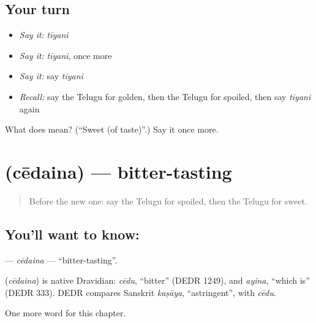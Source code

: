 \subsection*{Your turn}
\begin{itemize}
\raggedright
  \item \emph{Say it:} \emph{tīyani}
  \item \emph{Say it:} \emph{tīyani}, once more
  \item \emph{Say it:} say \emph{tīyani}
  \item \emph{Recall:} say the Telugu for golden, then the Telugu for spoiled, then say \emph{tīyani} again
\end{itemize}

\begin{tcolorbox}[breakable,colback=teal!4,colframe=teal!35!black,title={Before you move on}]
What does  mean? (\textquotedblleft{}Sweet (of taste)\textquotedblright{}.) Say it once more.
\end{tcolorbox}
\section[\texorpdfstring{\te{చేదైన} (cēdaina)}{చేదైన (cēdaina)}]{ (cēdaina) — bitter-tasting}

\label{lesson:TE-C141-cedaina}



\begin{quote}
Before the new one: say the Telugu for spoiled, then the Telugu for sweet.
\end{quote}

\subsection*{You'll want to know: }
\textbf{} — \emph{cēdaina} — \textquotedblleft{}bitter-tasting\textquotedblright{}.

\begin{cousinweb}
\textbf{} (\emph{cēdaina}) is native Dravidian: \emph{cēdu}, \textquotedblleft{}bitter\textquotedblright{} (DEDR 1249), and \emph{ayina}, \textquotedblleft{}which is\textquotedblright{} (DEDR 333). DEDR compares Sanskrit \emph{kaṣāya}, \textquotedblleft{}astringent\textquotedblright{}, with \emph{cēdu}.
\end{cousinweb}

\begin{grammarlens}[title={What you've built}]
One more word for this chapter.
\end{grammarlens}

